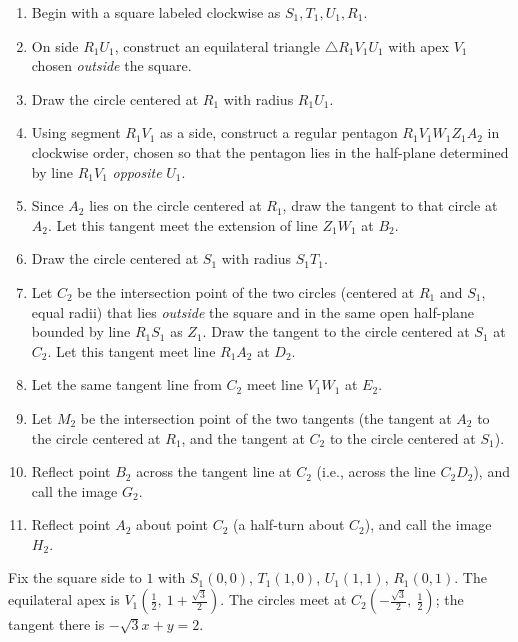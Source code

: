 \begin{enumerate}
  \item Begin with a square labeled clockwise as \(S_1, T_1, U_1, R_1\).
  \item On side \(R_1U_1\), construct an equilateral triangle \(\triangle R_1V_1U_1\) with apex \(V_1\) chosen \emph{outside} the square.
  \item Draw the circle centered at \(R_1\) with radius \(R_1U_1\).
  \item Using segment \(R_1V_1\) as a side, construct a regular pentagon
        \(R_1V_1W_1Z_1A_2\) in clockwise order, chosen so that the pentagon lies in the half-plane
        determined by line \(R_1V_1\) \emph{opposite} \(U_1\).
  \item Since \(A_2\) lies on the circle centered at \(R_1\), draw the tangent to that circle at \(A_2\).
        Let this tangent meet the extension of line \(Z_1W_1\) at \(B_2\).
  \item Draw the circle centered at \(S_1\) with radius \(S_1T_1\).
  \item Let \(C_2\) be the intersection point of the two circles (centered at \(R_1\) and \(S_1\), equal radii)
        that lies \emph{outside} the square and in the same open half-plane bounded by line \(R_1S_1\) as \(Z_1\).
        Draw the tangent to the circle centered at \(S_1\) at \(C_2\).
        Let this tangent meet line \(R_1A_2\) at \(D_2\).
  \item Let the same tangent line from \(C_2\) meet line \(V_1W_1\) at \(E_2\).
  \item Let \(M_2\) be the intersection point of the two tangents (the tangent at \(A_2\) to the circle centered at \(R_1\),
        and the tangent at \(C_2\) to the circle centered at \(S_1\)).
  \item Reflect point \(B_2\) across the tangent line at \(C_2\) (i.e., across the line \(C_2D_2\)), and call the image \(G_2\).
  \item Reflect point \(A_2\) about point \(C_2\) (a half-turn about \(C_2\)), and call the image \(H_2\).
\end{enumerate}


\SolutionPage
\begingroup\small
Fix the square side to \(1\) with \(S_1(0,0)\), \(T_1(1,0)\), \(U_1(1,1)\), \(R_1(0,1)\). The equilateral apex is \(V_1(\tfrac12,\ 1+\tfrac{\sqrt3}{2})\). The circles meet at \(C_2(-\tfrac{\sqrt3}{2},\ \tfrac12)\); the tangent there is \(-\sqrt3x+y=2\).

